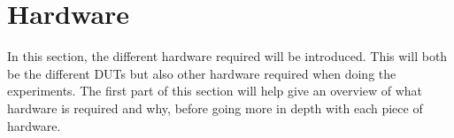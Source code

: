 \section{Hardware}\label{sec:hardware}


In this section, the different hardware required will be introduced. This will both be the different DUTs but also other hardware required when doing the experiments. The first part of this section will help give an overview of what hardware is required and why, before going more in depth with each piece of hardware.



%
